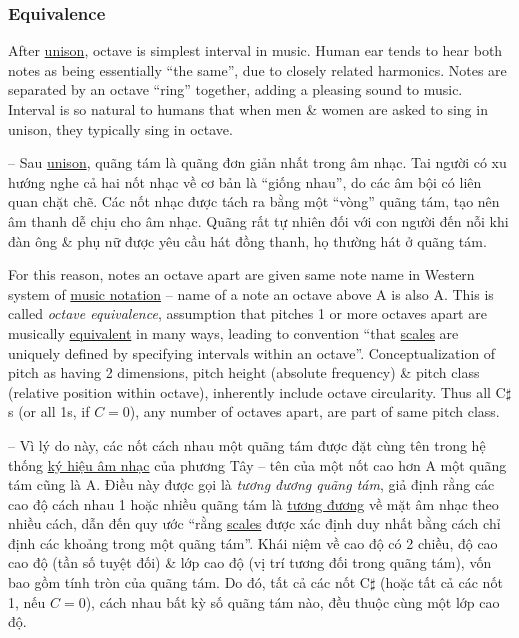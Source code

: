 \documentclass{article}
\begin{document}
\subsubsection{Equivalence}
After \href{https://en.wikipedia.org/wiki/Unison}{unison}, octave is simplest interval in music. Human ear tends to hear both notes as being essentially ``the same'', due to closely related harmonics. Notes are separated by an octave ``ring'' together, adding a pleasing sound to music. Interval is so natural to humans that when men \& women are asked to sing in unison, they typically sing in octave.

-- Sau \href{https://en.wikipedia.org/wiki/Unison}{unison}, quãng tám là quãng đơn giản nhất trong âm nhạc. Tai người có xu hướng nghe cả hai nốt nhạc về cơ bản là ``giống nhau'', do các âm bội có liên quan chặt chẽ. Các nốt nhạc được tách ra bằng một ``vòng'' quãng tám, tạo nên âm thanh dễ chịu cho âm nhạc. Quãng rất tự nhiên đối với con người đến nỗi khi đàn ông \& phụ nữ được yêu cầu hát đồng thanh, họ thường hát ở quãng tám.

For this reason, notes an octave apart are given same note name in Western system of \href{https://en.wikipedia.org/wiki/Music_notation}{music notation} -- name of a note an octave above A is also A. This is called {\it octave equivalence}, assumption that pitches 1 or more octaves apart are musically \href{https://en.wikipedia.org/wiki/Equivalence_class_(music)}{equivalent} in many ways, leading to convention ``that \href{https://en.wikipedia.org/wiki/Scale_(music)}{scales} are uniquely defined by specifying intervals within an octave''. Conceptualization of pitch as having 2 dimensions, pitch height (absolute frequency) \& pitch class (relative position within octave), inherently include octave circularity. Thus all C$\sharp$s (or all 1s, if $C = 0$), any number of octaves apart, are part of same pitch class.

-- Vì lý do này, các nốt cách nhau một quãng tám được đặt cùng tên trong hệ thống \href{https://en.wikipedia.org/wiki/Music_notation}{ký hiệu âm nhạc} của phương Tây -- tên của một nốt cao hơn A một quãng tám cũng là A. Điều này được gọi là {\it tương đương quãng tám}, giả định rằng các cao độ cách nhau 1 hoặc nhiều quãng tám là \href{https://en.wikipedia.org/wiki/Equivalence_class_(music)}{tương đương} về mặt âm nhạc theo nhiều cách, dẫn đến quy ước ``rằng \href{https://en.wikipedia.org/wiki/Scale_(music)}{scales} được xác định duy nhất bằng cách chỉ định các khoảng trong một quãng tám''. Khái niệm về cao độ có 2 chiều, độ cao cao độ (tần số tuyệt đối) \& lớp cao độ (vị trí tương đối trong quãng tám), vốn bao gồm tính tròn của quãng tám. Do đó, tất cả các nốt C$\sharp$ (hoặc tất cả các nốt 1, nếu $C = 0$), cách nhau bất kỳ số quãng tám nào, đều thuộc cùng một lớp cao độ.
\end{document}

